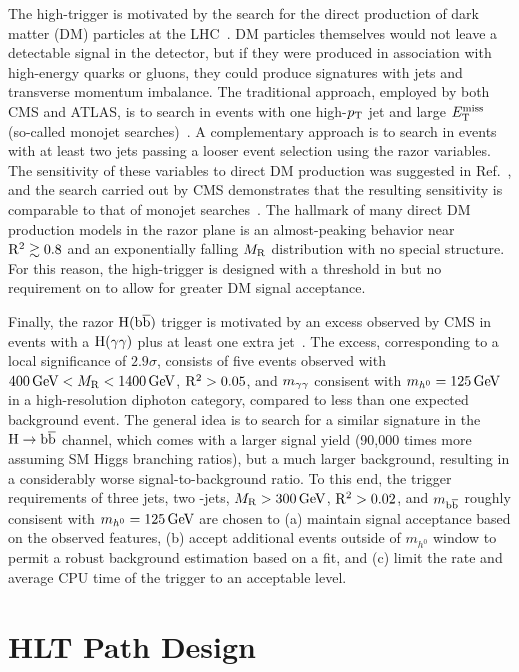The high-\Rtwo trigger is motivated by the search for the direct
production of dark matter (DM) particles at the
LHC~\cite{Khachatryan:2016reg}.  DM particles themselves
would not leave a detectable signal in the detector, but if
they were produced in association with high-energy quarks or gluons,
they could produce signatures with jets and transverse
momentum imbalance. The traditional approach, employed by both CMS and
ATLAS, is to search in events with one high-$p_{\mathrm{T}}$ jet and large $E_{\mathrm{T}}^{\text{miss}}$
(so-called monojet searches)~\cite{Aad:2011xw,Chatrchyan:2012me}. A complementary
approach is to search in events with at least two jets passing a looser
event selection using the razor variables. The sensitivity of these variables to direct DM production was
suggested in Ref.~\cite{Fox:2012ee}, and the search carried out by CMS
demonstrates that the resulting sensitivity is comparable to that of
monojet searches~\cite{Fox:2012ee,Papucci:2014iwa,Khachatryan:2016reg}.
The hallmark of many direct DM production models in the razor plane is an
almost-peaking behavior near $\mathrm{R}^2\gtrsim 0.8$ and an exponentially
falling $M_\mathrm{R}$ distribution with no special structure. For this reason,
the high-\Rtwo trigger is designed with a threshold in \Rtwo but no
requirement on \MR to allow for greater DM signal acceptance.

Finally, the razor $\mathrm{H}(\mathrm{b}\overline{\mathrm{b}})$ trigger is motivated by an
excess observed by CMS in events with a $\mathrm{H}
(\gamma\gamma)$ plus at least one extra jet~\cite{RazorHgaga}. The excess,
corresponding to a local significance of
$2.9\sigma$, consists of five events observed with $400\,\text{Ge\hspace{-.08em}V}<M_\mathrm{R}<1400
\,\text{Ge\hspace{-.08em}V}$,  $\mathrm{R}^2>0.05$, and $m_{\gamma\gamma}$ consisent with $m_{h^0}= 125
\,\text{Ge\hspace{-.08em}V}$ in a high-resolution diphoton category, compared to less than one
expected background event. The general idea is to search for a similar
signature in the $\mathrm{H}\to\mathrm{b}\overline{\mathrm{b}}$ channel, which comes with a larger
signal yield (90,000 times more assuming SM Higgs branching ratios),
but a much larger background, resulting in a considerably worse
signal-to-background ratio. To this end, the trigger
requirements of three jets, two \cPqb-jets, $M_\mathrm{R}>300
\,\text{Ge\hspace{-.08em}V}$,  $\mathrm{R}^2>0.02$, and $m_{\mathrm{b}\overline{\mathrm{b}}}$ roughly consisent with $m_{h^0}= 125
\,\text{Ge\hspace{-.08em}V}$ are chosen to (a) maintain signal acceptance based on the observed
features, (b) accept additional events outside of $m_{h^0}$ window
to permit a robust background estimation based on a fit, and (c)
limit the rate and average CPU time of the trigger to an acceptable level.

\section{HLT Path Design}

